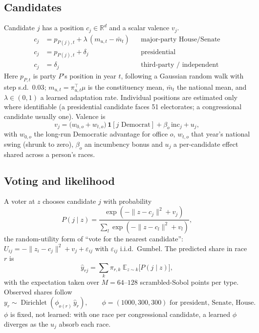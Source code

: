 \documentclass[11pt]{article}
\newcommand{\R}{\mathbb{R}}
\newcommand{\E}{\mathbb{E}}
\begin{document}
\FloatBarrier
\subsection{Candidates}
Candidate $j$ has a position $c_j\in\R^d$ and a scalar valence $v_j$.
\begin{align}
c_j &= p_{P(j),t} + \lambda\,(m_{u,t}-\bar m_t) && \text{major-party House/Senate} \\
c_j &= p_{P(j),t} + \delta_j && \text{presidential} \\
c_j &= \delta_j && \text{third-party / independent}
\end{align}
Here $p_{P,t}$ is party $P$'s position in year $t$, following a Gaussian random walk with step s.d.\ $0.03$; $m_{u,t}=\pi_{u,t}^{\top}\mu$ is the constituency mean, $\bar m_t$ the national mean, and $\lambda\in(0,1)$ a learned adaptation rate. Individual positions are estimated only where identifiable (a presidential candidate faces 51 electorates; a congressional candidate usually one). Valence is
\begin{equation}
v_j = \big(w_{0,o} + w_{t,o}\big)\,\mathbf 1[j \text{ Democrat}] + \beta_o\,\mathrm{inc}_j + u_j ,
\end{equation}
with $w_{0,o}$ the long-run Democratic advantage for office $o$, $w_{t,o}$ that year's national swing (shrunk to zero), $\beta_o$ an incumbency bonus and $u_j$ a per-candidate effect shared across a person's races.

\FloatBarrier
\subsection{Voting and likelihood}
A voter at $z$ chooses candidate $j$ with probability
\begin{equation}
P(j\mid z) = \frac{\exp\!\left(-\lVert z-c_j\rVert^2 + v_j\right)}{\sum_{l}\exp\!\left(-\lVert z-c_l\rVert^2 + v_l\right)} ,
\label{eq:choice}
\end{equation}
the random-utility form of ``vote for the nearest candidate'': $U_{ij} = -\lVert z_i-c_j\rVert^2+v_j+\varepsilon_{ij}$ with $\varepsilon_{ij}$ i.i.d.\ Gumbel. The predicted share in race $r$ is
\begin{equation}
\hat y_{rj} = \sum_k \pi_{r,k}\; \E_{z\sim k}\big[P(j\mid z)\big],
\end{equation}
with the expectation taken over $M=64$--$128$ scrambled-Sobol points per type. Observed shares follow
\begin{equation}
y_r \sim \operatorname{Dirichlet}\!\left(\phi_{o(r)}\,\hat y_r\right), \qquad \phi = (1000, 300, 300) \text{ for president, Senate, House.}
\end{equation}
$\phi$ is fixed, not learned: with one race per congressional candidate, a learned $\phi$ diverges as the $u_j$ absorb each race.
\end{document}
